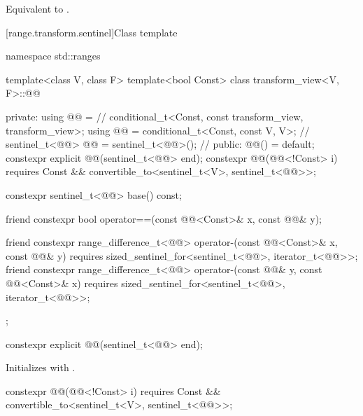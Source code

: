 \begin{itemdescr}
\pnum
\effects
Equivalent to .
\end{itemdescr}


[range.transform.sentinel]{Class template }

%
\begin{codeblock}
namespace std::ranges {
  template<class V, class F>
  template<bool Const>
  class transform_view<V, F>::@@ {
  private:
    using @@ =                                      // \expos
      conditional_t<Const, const transform_view, transform_view>;
    using @@ = conditional_t<Const, const V, V>;      // \expos
    sentinel_t<@@> @@ = sentinel_t<@@>();         // \expos
  public:
    @@() = default;
    constexpr explicit @@(sentinel_t<@@> end);
    constexpr @@(@@<!Const> i)
      requires Const && convertible_to<sentinel_t<V>, sentinel_t<@@>>;

    constexpr sentinel_t<@@> base() const;

    friend constexpr bool operator==(const @@<Const>& x, const @@& y);

    friend constexpr range_difference_t<@@>
      operator-(const @@<Const>& x, const @@& y)
        requires sized_sentinel_for<sentinel_t<@@>, iterator_t<@@>>;
    friend constexpr range_difference_t<@@>
      operator-(const @@& y, const @@<Const>& x)
        requires sized_sentinel_for<sentinel_t<@@>, iterator_t<@@>>;
  };
}
\end{codeblock}

%
\begin{itemdecl}
constexpr explicit @@(sentinel_t<@@> end);
\end{itemdecl}

\begin{itemdescr}
\pnum
\effects
Initializes  with .
\end{itemdescr}

%
\begin{itemdecl}
constexpr @@(@@<!Const> i)
  requires Const && convertible_to<sentinel_t<V>, sentinel_t<@@>>;
\end{itemdecl}

